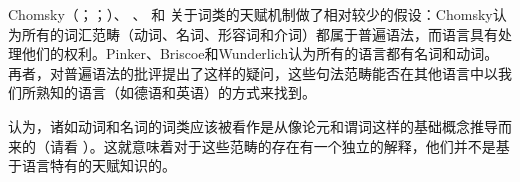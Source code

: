 Chomsky（\citeyear[]{Chomsky88a-u}；\citeyear{Chomsky91a-u}；\citeyear[]{Chomsky95a-u}）、 \citet[, 286]{Pinker94a}、 \citet[]{Briscoe2000a}和 \citet[]{Wunderlich2004a}关于词类的天赋机制做了相对较少的假设：Chomsky认为所有的词汇范畴（动词、名词、形容词和介词）都属于普遍语法，而语言具有处理他们的权利。Pinker、Briscoe和Wunderlich认为所有的语言都有名词和动词。再者，对普遍语法的批评提出了这样的疑问，这些句法范畴能否在其他语言中以我们所熟知的语言（如德语和英语）的方式来找到。

 \citet[]{Braine87a}认为，诸如动词和名词的词类应该被看作是从像论元和谓词这样的基础概念推导而来的（请看 ）。这就意味着对于这些范畴的存在有一个独立的解释，他们并不是基于语言特有的天赋知识的。

